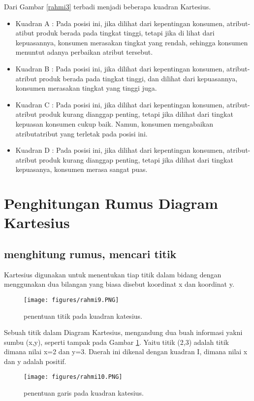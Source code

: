 Dari Gambar \ref{rahmi3} terbadi menjadi beberapa kuadran Kartesius.
\begin{itemize}
\item Kuadran A :
Pada posisi ini, jika dilihat dari kepentingan konsumen, atribut-atibut produk berada pada tingkat tinggi, tetapi jika di lihat dari kepuasannya, 
konsumen merasakan tingkat yang rendah, sehingga konsumen menuntut adanya perbaikan atribut tersebut.
\item Kuadran B :
Pada posisi ini, jika dilihat dari kepentingan konsumen, atribut-atribut produk berada pada tingkat tinggi, dan dilihat dari kepuasannya, 
konsumen merasakan tingkat yang tinggi juga.
\item Kuadran C :
Pada posisi ini, jika dilihat dari kepentingan konsumen, atribut-atribut produk kurang dianggap penting, tetapi jika dilihat dari tingkat kepuasan konsumen cukup baik.
Namun, konsumen mengabaikan atributatribut yang terletak pada posisi ini.
\item Kuadran D :
Pada posisi ini, jika dilihat dari kepentingan konsumen, atribut-atribut produk kurang dianggap penting, tetapi jika dilihat dari tingkat kepuasanya, konsumen merasa
sangat puas.
\end{itemize}


\section{Penghitungan Rumus Diagram Kartesius}
\subsection{menghitung rumus, mencari titik}

Kartesius digunakan untuk menentukan tiap titik dalam bidang dengan menggunakan dua bilangan yang biasa disebut koordinat x dan koordinat y.
\begin{figure}[ht]
	\centerline{\texttt{[image: figures/rahmi9.PNG]}}
	\caption{penentuan titik pada kuadran katesius.}
	\label{rahmi9}
\end{figure}

Sebuah titik dalam Diagram Kartesius, mengandung dua buah informasi yakni sumbu (x,y), seperti tampak pada Gambar \ref{rahmi9}. 
Yaitu titik (2,3) adalah titik dimana nilai x=2 dan y=3. Daerah ini dikenal dengan kuadran I, dimana nilai x dan y adalah positif.
\begin{figure}[ht]
	\centerline{\texttt{[image: figures/rahmi10.PNG]}}
	\caption{penentuan garis pada kuadran katesius.}
	\label{rahmi10}
	\end{figure}


